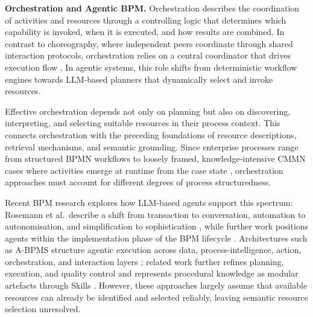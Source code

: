 \documentclass[10pt,twocolumn]{article}
\begin{document}
\textbf{Orchestration and Agentic BPM.} Orchestration describes the coordination of activities and resources through a controlling logic that determines which capability is invoked, when it is executed, and how results are combined. In contrast to choreography, where independent peers coordinate through shared interaction protocols, orchestration relies on a central coordinator that drives execution flow \citep{melzer_service-orientierte_2010}. In agentic systems, this role shifts from deterministic workflow engines towards LLM-based planners that dynamically select and invoke resources.

Effective orchestration depends not only on planning but also on discovering, interpreting, and selecting suitable resources in their process context. This connects orchestration with the preceding foundations of resource descriptions, retrieval mechanisms, and semantic grounding. Since enterprise processes range from structured BPMN workflows to loosely framed, knowledge-intensive CMMN cases where activities emerge at runtime from the case state \citep{van_der_aalst_business_2013,di_ciccio_knowledge-intensive_2015,aagesen_bpmn_2014,object_management_group_case_2016,motahari-nezhad_adaptive_2013}, orchestration approaches must account for different degrees of process structuredness.

Recent BPM research explores how LLM-based agents support this spectrum: Rosemann et al.\ describe a shift from transaction to conversation, automation to autonomisation, and simplification to sophistication \citep{rosemann_business_2024}, while further work positions agents within the implementation phase of the BPM lifecycle \citep{vidgof_llm_bpm_2023,fettke_business_2025,di_francescomarino_large_2023}. Architectures such as A-BPMS structure agentic execution across data, process-intelligence, action, orchestration, and interaction layers \citep{dumas_agentic_2026}; related work further refines planning, execution, and quality control \citep{adimulam_orchestration_2026} and represents procedural knowledge as modular artefacts through Skills \citep{anthropic_skills_2025,ling_agent_2026,li_skillsbench_2026}. However, these approaches largely assume that available resources can already be identified and selected reliably, leaving semantic resource selection unresolved.

\end{document}
